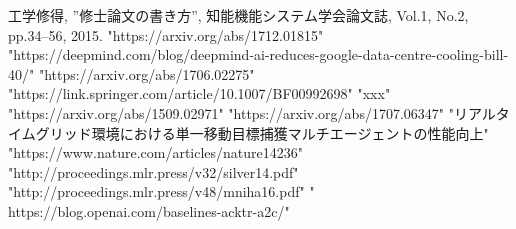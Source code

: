 \documentclass[11pt,twocolumn]{jarticle} %
\begin{document}

\begin{thebibliography}{9}
  工学修得, ''修士論文の書き方'', 知能機能システム学会論文誌, Vol.1, No.2, pp.34--56, 2015.
 "https://arxiv.org/abs/1712.01815"
 "https://deepmind.com/blog/deepmind-ai-reduces-google-data-centre-cooling-bill-40/"
 "https://arxiv.org/abs/1706.02275"
 "https://link.springer.com/article/10.1007/BF00992698"
 "xxx"
 "https://arxiv.org/abs/1509.02971"
 "https://arxiv.org/abs/1707.06347"
 "リアルタイムグリッド環境における単一移動目標捕獲マルチエージェントの性能向上"
 "https://www.nature.com/articles/nature14236"
 "http://proceedings.mlr.press/v32/silver14.pdf"
 "http://proceedings.mlr.press/v48/mniha16.pdf"
 " https://blog.openai.com/baselines-acktr-a2c/"
\end{thebibliography}
\end{document}

